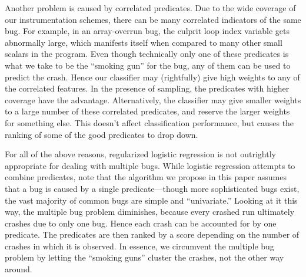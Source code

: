 Another problem is caused by correlated predicates.
Due to the wide coverage of our instrumentation schemes, there can be
many correlated indicators of the same bug.  For example, in an
array-overrun bug, the culprit loop index variable gets abnormally
large, which manifests itself when compared to many other small
scalars in the program.  Even though technically only one of these
predicates is what we take to be the ``smoking gun'' for the bug, any
of them can be used to predict the crash.  Hence our classifier may
(rightfully) give high weights to any of the correlated features.  In
the presence of sampling, the predicates with higher coverage have the
advantage.  Alternatively, the classifier may give smaller
weights to a large number of these correlated predicates, and reserve
the larger weights for something else.  This doesn't affect
classification performance, but causes the ranking of
some of the good predicates to drop down.

For all of the above reasons, regularized logistic regression is not
outrightly appropriate for dealing with multiple bugs.  While logistic
regression attempts to combine predicates, note that the algorithm we
propose in this paper assumes that a bug is caused by a single
predicate---though more sophisticated bugs exist, the vast majority of
common bugs are simple and ``univariate.''  Looking at it this way,
the multiple bug problem diminishes, because every crashed run
ultimately crashes due to only one bug.  Hence each crash can be
accounted for by one predicate.  The predicates are then ranked by a
score depending on the number of crashes in which it is observed.  In
essence, we circumvent the multiple bug problem by letting the
``smoking guns'' cluster the crashes, not the other way around.

